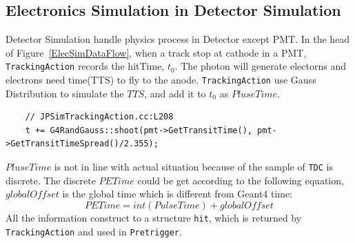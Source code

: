 \subsection{Electronics Simulation in Detector Simulation}
Detector Simulation handle physics process in Detector except PMT. In the head of Figure~\ref{ElecSimDataFlow}, when a track stop at cathode in a PMT,
\texttt{TrackingAction} records the hitTime, $t_0$. The photon will generate electorns and electrons need time(TTS) to fly to the anode. 
\texttt{TrackingAction} use Gauss Distribution to simulate the $TTS$, and add it to $t_0$ as $PluseTime$.
\begin{lstlisting}
    // JPSimTrackingAction.cc:L208
    t += G4RandGauss::shoot(pmt->GetTransitTime(), pmt->GetTransitTimeSpread()/2.355);
\end{lstlisting}
$PluseTime$ is not in line with actual situation because of the sample of \texttt{TDC} is discrete.
The discrete $PETime$ could be get according to the following equation, $globalOffset$ is the global time which is different from Geant4 time:
\[PETime=int(PulseTime)+globalOffset\]
All the information construct to a structure \texttt{hit}, which is returned by \texttt{TrackingAction} and used in \texttt{Pretrigger}.
